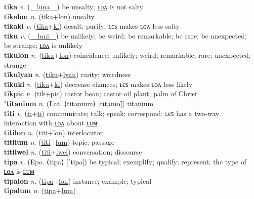 \textbf{tika} \textit{v.} (\hyperref[luna]{~~luna~~})
be unsalty; \hyperref[tikalon]{ʟᴏᴧ} is not salty \label{tika} \\
\textbf{tikalon} \textit{n.} (\hyperref[tika]{tika}+\hyperref[lon]{lon})
unsalty \label{tikalon} \\
\textbf{tikaki} \textit{v.} (\hyperref[tika]{tika}+\hyperref[ki]{ki})
desalt; purify; ʟєꜱ makes ʟᴏᴧ less salty \label{tikaki} \\
\textbf{tiku} \textit{v.} (\hyperref[luni]{~~luni~~})
be unlikely; be weird; be remarkable; be rare; be unexpected; be strange; \hyperref[tikulon]{ʟᴏᴧ} is unlikely \label{tiku} \\
\textbf{tikulon} \textit{n.} (\hyperref[tiku]{tiku}+\hyperref[lon]{lon})
coincidence; unlikely; weird; remarkable; rare; unexpected; strange \label{tikulon} \\
\textbf{tikulyan} \textit{n.} (\hyperref[tiku]{tiku}+\hyperref[lyan]{lyan})
rarity; weirdness \label{tikulyan} \\
\textbf{tikuki} \textit{v.} (\hyperref[tiku]{tiku}+\hyperref[ki]{ki})
decrease chances; ʟєꜱ makes ʟᴏᴧ less likely \label{tikuki} \\
\textbf{tikpic} \textit{n.} (\hyperref[tik]{tik}+\hyperref[pic]{pic})
castor bean; castor oil plant; palm of Christ \label{tikpic} \\
\textbf{'titanium} \textit{n.} (Lat. ⟨titanium⟩ [tɪtanɪʊ̃])
titanium \label{'titanium} \\
\textbf{titi} \textit{v.} (\hyperref[ti]{ti}+\hyperref[ti]{ti})
communicate; talk; speak; correspond; ʟєꜱ has a two-way interaction with \hyperref[titilon]{ʟᴏᴧ} about \hyperref[titilum]{ʟᴜᴍ} \label{titi} \\
\textbf{titilon} \textit{n.} (\hyperref[titi]{titi}+\hyperref[lon]{lon})
interlocutor \label{titilon} \\
\textbf{titilum} \textit{n.} (\hyperref[titi]{titi}+\hyperref[lum]{lum})
topic; passage \label{titilum} \\
\textbf{titilwel} \textit{n.} (\hyperref[titi]{titi}+\hyperref[lwel]{lwel})
conversation; discourse \label{titilwel} \\
\textbf{tipa} \textit{v.} (Epo. ⟨tipa⟩ [ˈtipa])
be typical; exemplify; qualify; represent; the type of \hyperref[tipalon]{ʟᴏᴧ} is \hyperref[tipalum]{ʟᴜᴍ} \label{tipa} \\
\textbf{tipalon} \textit{n.} (\hyperref[tipa]{tipa}+\hyperref[lon]{lon})
instance; example; typical \label{tipalon} \\
\textbf{tipalum} \textit{n.} (\hyperref[tipa]{tipa}+\hyperref[lum]{lum})
